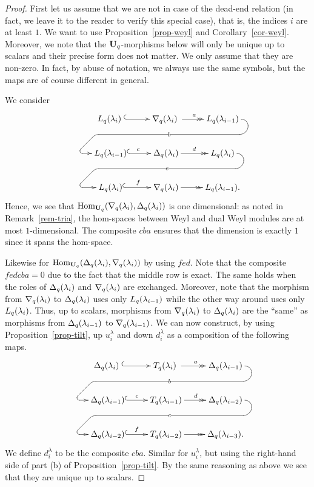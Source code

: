 \begin{proof}
First let us assume that we are not in case of the 
dead-end relation (in fact, we leave it to 
the reader to verify this special case), 
that is, the indices $i$ are at least $1$. 
We want to use Proposition~\ref{prop-weyl} 
and Corollary~\ref{cor-weyl}. Moreover, we 
note that the $\boldsymbol{\mathrm{U}}_q$-morphisms below will 
only be unique up to scalars and their 
precise form does not matter. We only 
assume that they are non-zero. In fact, 
by abuse of notation, we always use the 
same symbols, but the maps are of course different in general.




We consider
\[
\xymatrix{
    & \Ln{\lambda_i}\phantom{.} \ar@{^{(}->}[r] & \dVn{\lambda_i}\phantom{.} \ar@{->>}[r]^a & \Ln{\lambda_{i-1}}
                \ar@{->} `r/8pt[d] `/10pt[l] `^dl[ll]|b `^r/3pt[dll] [dll] \\
             & \Ln{\lambda_{i-1}} \ar@{^{(}->}[r]^c & \Vn{\lambda_{i}} \ar@{->>}[r]^d & \Ln{\lambda_{i}}
                \ar@{->} `r/8pt[d] `/10pt[l] `^dl[ll]|e `^r/3pt[dll] [dll] \\
             & \Ln{\lambda_{i}} \ar@{^{(}->}[r]^f & \dVn{\lambda_{i}} \ar@{->>}[r] & \Ln{\lambda_{i-1}}.
    }
\]
Hence, we see that $\mathrm{Hom}_{\boldsymbol{\mathrm{U}}_q}(\nabla_q({\lambda_i}),\Delta_q({\lambda_i}))$ is 
one dimensional: as noted in Remark~\ref{rem-tria}, the 
hom-spaces between Weyl and dual Weyl modules are at 
most $1$-dimensional. The composite $cba$ ensures 
that the dimension is exactly $1$ since it spans the hom-space.




Likewise for $\mathrm{Hom}_{\boldsymbol{\mathrm{U}}_q}(\Delta_q({\lambda_i}),\nabla_q({\lambda_i}))$ by 
using $fed$. Note that the composite $fedcba=0$ due to 
the fact that the middle row is exact. The same holds when the roles 
of $\Delta_q({\lambda_i})$ and $\nabla_q({\lambda_i})$ are exchanged. 
Moreover, note that the morphism from $\nabla_q({\lambda_i})$ to 
$\Delta_q({\lambda_i})$ uses only $L_q({\lambda_{i-1}})$ while the 
other way around uses only $L_q({\lambda_{i}})$. Thus, up 
to scalars, morphisms from $\nabla_q({\lambda_i})$ to $\Delta_q({\lambda_i})$ are 
the ``same'' as morphisms from $\Delta_q({\lambda_{i-1}})$ to $\nabla_q({\lambda_{i-1}})$.
We can now construct, by using Proposition~\ref{prop-tilt}, 
up $u_i^{\lambda}$ and 
down $d_i^{\lambda}$ 
as a composition of the following maps.
\[
\xymatrix{
    & \Vn{\lambda_i}\phantom{.} \ar@{^{(}->}[r] & \Tn{\lambda_i}\phantom{.} \ar@{->>}[r]^a & \Vn{\lambda_{i-1}}
                \ar@{->} `r/8pt[d] `/10pt[l] `^dl[ll]|b `^r/3pt[dll] [dll] \\
             & \Vn{\lambda_{i-1}} \ar@{^{(}->}[r]^c & \Tn{\lambda_{i-1}} \ar@{->>}[r]^d & \Vn{\lambda_{i-2}}
             \ar@{->} `r/8pt[d] `/10pt[l] `^dl[ll]|e `^r/3pt[dll] [dll] \\
             & \Vn{\lambda_{i-2}} \ar@{^{(}->}[r]^f & \Tn{\lambda_{i-2}} \ar@{->>}[r] & \Vn{\lambda_{i-3}}.
    }
\]
We define $d_i^{\lambda}$ to be the 
composite $cba$. Similar for $u_i^{\lambda}$, 
but using the right-hand side of part (b) of 
Proposition~\ref{prop-tilt}. By the same 
reasoning as above we see that they are unique up to scalars.





\end{proof}
